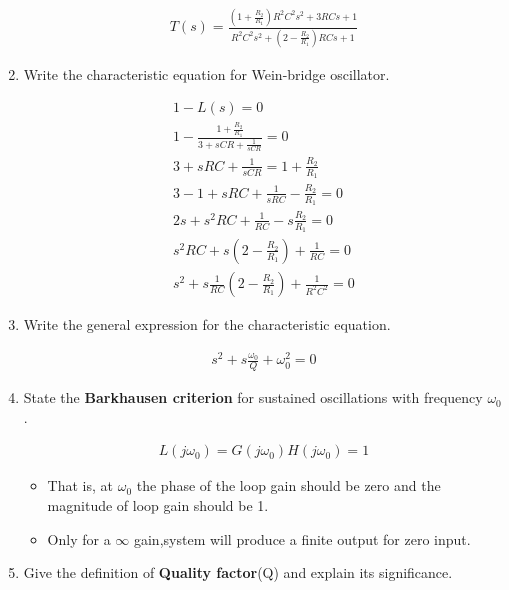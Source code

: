 \begin{enumerate}[label=\arabic*.,ref=\theenumi]
\solution
\begin{align}
T(s) = \frac{(1+\frac{R_2}{R_1}) R^{2}C^{2}s^{2}+3RCs+1 }{R^{2}C^{2}s^{2}+(2-\frac{R_2}{R_1})RCs+1} \label{eq:ee18btech11044_3_7}
\end{align}





\item Write the characteristic equation for Wein-bridge oscillator.

\solution
\begin{align}
    1 - L(s) = 0  \\
    1 - \frac{1 + \frac{R_2}{R_1}}{3 + sCR + \frac{1}{sCR}} = 0  \\
    3 + sRC + \frac{1}{sCR} = 1 + \frac{R_2}{R_1}  \\
    3 - 1 +sRC +\frac{1}{sRC} -\frac{R_2}{R_1} = 0  \\
    2s + s^2 RC + \frac{1}{RC} -s\frac{R_2}{R_1} = 0  \\
    s^2 RC + s(2 - \frac{R_2}{R_1}) + \frac{1}{RC} =0 \\
    s^2 + s \frac{1}{RC}(2-\frac{R_2}{R_1}) + \frac{1}{R^2C^2} = 0 \label{eq:ee18btech11044_3_3}
\end{align}

\item
Write the general expression for the characteristic equation.

\solution
\begin{align}
    s^2 + s\frac{\omega_0}{Q} + \omega_0^2 = 0 \label{eq:ee18btech11044_3_4}
\end{align}

\item State the \textbf{Barkhausen criterion} for sustained oscillations with frequency $\omega_0$.

\solution
\begin{align}
    L(j\omega_0) = G(j\omega_0)  H(j\omega_0) = 1
\end{align}
\begin{itemize}
    \item That is, at $\omega_0$ the phase of the loop gain should be zero and the magnitude of loop gain should be 1.
    \item Only for a $\infty$ gain,system will produce a finite output for zero input. 
\end{itemize}

\item Give the definition of \textbf{Quality factor}(Q) and explain its significance.


\end{enumerate}
